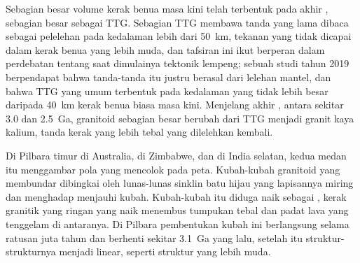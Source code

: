 Sebagian besar volume kerak benua masa kini telah terbentuk pada akhir , sebagian besar
sebagai TTG. Sebagian TTG membawa tanda  yang lama dibaca sebagai pelelehan pada kedalaman lebih dari
\qty{50}{km}, tekanan yang tidak dicapai dalam kerak benua yang lebih muda, dan tafsiran ini
ikut berperan dalam perdebatan tentang saat dimulainya tektonik lempeng; sebuah studi tahun 2019 berpendapat bahwa tanda-tanda itu
justru berasal dari lelehan mantel, dan bahwa TTG yang umum terbentuk pada
kedalaman yang tidak lebih besar daripada \qty{40}{km} kerak benua biasa masa kini. Menjelang akhir
, antara sekitar 3.0 dan \qty{2.5}{Ga}, granitoid sebagian besar  berubah dari TTG
menjadi granit kaya kalium, tanda kerak yang lebih tebal yang dilelehkan kembali.

Di Pilbara timur di Australia, di Zimbabwe, dan di India selatan, kedua medan itu menggambar
pola yang mencolok pada peta. Kubah-kubah granitoid yang membundar dibingkai oleh lunas-lunas sinklin batu hijau yang lapisannya miring dan menghadap menjauhi kubah. Kubah-kubah itu
diduga naik sebagai , kerak granitik yang ringan yang naik menembus tumpukan tebal dan padat
lava yang tenggelam di antaranya. Di Pilbara pembentukan kubah ini berlangsung selama ratusan juta
tahun dan berhenti sekitar \qty{3.1}{Ga} yang lalu, setelah itu struktur-strukturnya menjadi linear, seperti struktur
 yang lebih muda.

